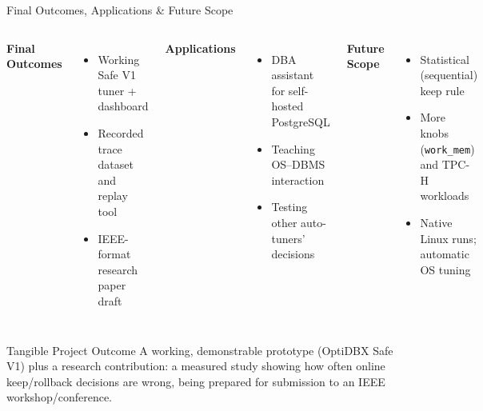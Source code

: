 \documentclass[aspectratio=169,11pt]{beamer}
\begin{document}
\begin{frame}{Final Outcomes, Applications \& Future Scope}

\begin{columns}[T,totalwidth=\textwidth]


\textbf{\color{GEUBlue}Final Outcomes}

\begin{itemize}\itemsep2pt\small
    \item Working Safe V1 tuner + dashboard
    \item Recorded trace dataset and replay tool
    \item IEEE-format research paper draft
\end{itemize}


\textbf{\color{GEUBlue}Applications}

\begin{itemize}\itemsep2pt\small
    \item DBA assistant for self-hosted PostgreSQL
    \item Teaching OS--DBMS interaction
    \item Testing other auto-tuners' decisions
\end{itemize}


\textbf{\color{GEUBlue}Future Scope}

\begin{itemize}\itemsep2pt\small
    \item Statistical (sequential) keep rule
    \item More knobs (\texttt{work\_mem}) and TPC-H workloads
    \item Native Linux runs; automatic OS tuning
\end{itemize}

\end{columns}

\vspace{4mm}

\begin{block}{Tangible Project Outcome}
\small
A working, demonstrable prototype (OptiDBX Safe V1) plus a research contribution:
a measured study showing how often online keep/rollback decisions are wrong, being
prepared for submission to an IEEE workshop/conference.
\end{block}

\end{frame}
\end{document}
